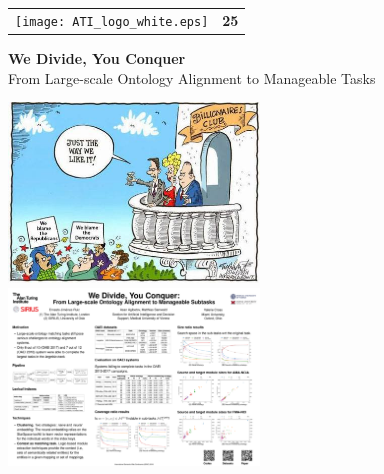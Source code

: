 \documentclass[t]{beamer}
\title{}
\subtitle{}
\date{October 11, 2018}
\author{Author name(s)}
\begin{document}
\begin{frame}
    \vspace{-0.75cm}
    \begin{table}
    \begin{tabular}{p{13cm}p{5cm}}
         \texttt{[image: ATI\_logo\_white.eps]}
         & {\huge \textbf{25}} \\
    \end{tabular}
    \end{table}
    
    
    {\Large \textbf{We Divide, You Conquer}}\\ {\large From Large-scale Ontology Alignment to Manageable Tasks}
    
    
    \vspace{-0.4cm}
    
    \begin{center}
    \includegraphics[width=0.5\textwidth]{images/divide-and-conquer-2.jpg}
    ~~
    \includegraphics[width=0.5\textwidth]{images/ISWC_OM_poster.pdf}
	\end{center}
	
\end{frame}
\end{document}
